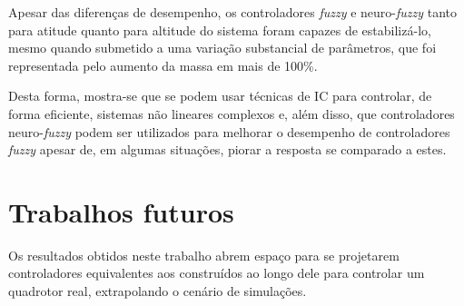 Apesar das diferenças de desempenho, os controladores \textit{fuzzy} e neuro-\textit{fuzzy} tanto para atitude quanto para altitude do sistema foram capazes de estabilizá-lo, mesmo quando submetido a uma variação substancial de parâmetros, que foi representada pelo aumento da massa em mais de 100\%.

Desta forma, mostra-se que se podem usar técnicas de IC para controlar, de forma eficiente, sistemas não lineares complexos e, além disso, que controladores neuro-\textit{fuzzy} podem ser utilizados para melhorar o desempenho de controladores \textit{fuzzy} apesar de, em algumas situações, piorar a resposta se comparado a estes.

\section{Trabalhos futuros}
\label{sec:conclusao-trabalhosFuturos}

Os resultados obtidos neste trabalho abrem espaço para  se projetarem controladores equivalentes aos construídos ao longo dele para controlar um quadrotor real, extrapolando o cenário de simulações.


%
%
